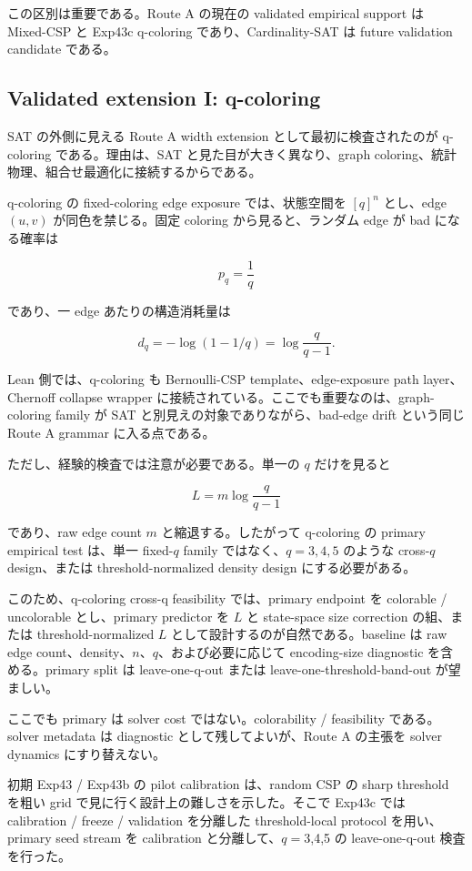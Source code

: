 \documentclass[12pt,a4paper]{article}
\begin{document}
この区別は重要である。Route A の現在の validated empirical support は Mixed-CSP と Exp43c q-coloring であり、Cardinality-SAT は future validation candidate である。

\subsection{Validated extension I: q-coloring}\label{validated-extension-i-q-coloring}

SAT の外側に見える Route A width extension として最初に検査されたのが q-coloring である。理由は、SAT と見た目が大きく異なり、graph coloring、統計物理、組合せ最適化に接続するからである。

q-coloring の fixed-coloring edge exposure では、状態空間を \([q]^n\) とし、edge \((u,v)\) が同色を禁じる。固定 coloring から見ると、ランダム edge が bad になる確率は

\[
p_{q}=\frac{1}{q}
\]

であり、一 edge あたりの構造消耗量は

\[
d_{q} = -\log(1-1/q) = \log\frac{q}{q-1}.
\]

Lean 側では、q-coloring も Bernoulli-CSP template、edge-exposure path layer、Chernoff collapse wrapper に接続されている。ここでも重要なのは、graph-coloring family が SAT と別見えの対象でありながら、bad-edge drift という同じ Route A grammar に入る点である。

ただし、経験的検査では注意が必要である。単一の \(q\) だけを見ると

\[
L=m\log\frac{q}{q-1}
\]

であり、raw edge count \(m\) と縮退する。したがって q-coloring の primary empirical test は、単一 fixed-\(q\) family ではなく、\(q=3,4,5\) のような cross-\(q\) design、または threshold-normalized density design にする必要がある。

このため、q-coloring cross-q feasibility では、primary endpoint を colorable / uncolorable とし、primary predictor を \(L\) と state-space size correction の組、または threshold-normalized \(L\) として設計するのが自然である。baseline は raw edge count、density、\(n\)、\(q\)、および必要に応じて encoding-size diagnostic を含める。primary split は leave-one-q-out または leave-one-threshold-band-out が望ましい。

ここでも primary は solver cost ではない。colorability / feasibility である。solver metadata は diagnostic として残してよいが、Route A の主張を solver dynamics にすり替えない。

初期 Exp43 / Exp43b の pilot calibration は、random CSP の sharp threshold を粗い grid で見に行く設計上の難しさを示した。そこで Exp43c では calibration / freeze / validation を分離した threshold-local protocol を用い、primary seed stream を calibration と分離して、\(q=3\),4,5 の leave-one-q-out 検査を行った。
\end{document}
